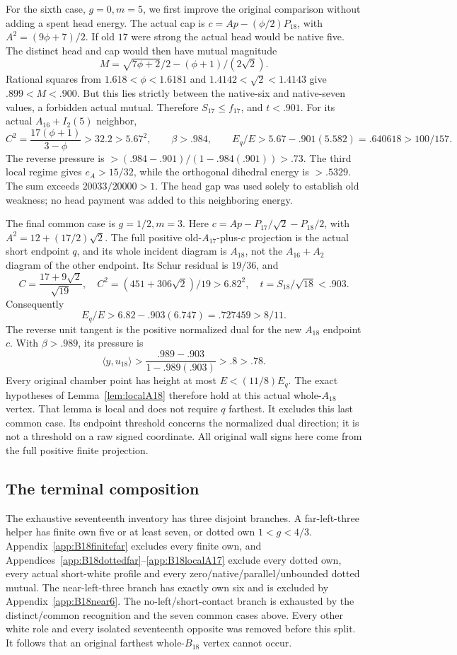\documentclass[11pt]{article}
\theoremstyle{definition}
\theoremstyle{remark}
\newcommand{\ip}[2]{\langle #1,#2\rangle}
\begin{document}
For the sixth case, \(g=0,m=5\), we first improve the original
comparison without adding a spent head energy.
The actual cap is \(c=Ap-(\phi/2)P_{18}\), with
\(A^2=(9\phi+7)/2\).
If old \(17\) were strong the actual head would be native five.
The distinct head and cap would then have mutual magnitude
\[
 M=\sqrt{7\phi+2}/2-(\phi+1)/(2\sqrt2).
\]
Rational squares from \(1.618<\phi<1.6181\) and
\(1.4142<\sqrt2<1.4143\) give \(.899<M<.900\).
But this lies strictly between the native-six and native-seven
values, a forbidden actual mutual.
Therefore \(S_{17}\leq f_{17}\), and \(t<.901\).
For its actual \(A_{16}+I_2(5)\) neighbor,
\[
 C^2=\frac{17(\phi+1)}{3-\phi}>32.2>5.67^2,\qquad
 \beta>.984,\qquad
 E_q/E>5.67-.901(5.582)=.640618>100/157 .
\]
The reverse pressure is
\(>(.984-.901)/(1-.984(.901))>.73\).
The third local regime gives \(e_A>15/32\), while the
orthogonal dihedral energy is \(>.5329\).
The sum exceeds \(20033/20000>1\).
The head gap was used solely to establish old weakness; no
head payment was added to this neighboring energy.

The final common case is \(g=1/2,m=3\).
Here \(c=Ap-P_{17}/\sqrt2-P_{18}/2\), with
\(A^2=12+(17/2)\sqrt2\).
The full positive old-\(A_{17}\)-plus-\(c\) projection is the
actual short endpoint \(q\), and its whole incident diagram is
\(A_{18}\), not the \(A_{16}+A_2\) diagram of the other endpoint.
Its Schur residual is \(19/36\), and
\[
 C=\frac{17+9\sqrt2}{\sqrt{19}},\quad
 C^2=(451+306\sqrt2)/19>6.82^2,\quad
 t=S_{18}/\sqrt{18}<.903 .
\]
Consequently
\[
 E_q/E>6.82-.903(6.747)=.727459>8/11 .
\]
The reverse unit tangent is the positive normalized dual for the
new \(A_{18}\) endpoint \(c\). With \(\beta>.989\),
its pressure is
\[
 \ip{y}{u_{18}}
 >\frac{.989-.903}{1-.989(.903)}>.8>.78 .
\]
Every original chamber point has height at most \(E<(11/8)E_q\).
The exact hypotheses of Lemma~\ref{lem:localA18} therefore hold
at this actual whole-\(A_{18}\) vertex.
That lemma is local and does not require \(q\) farthest.
It excludes this last common case. Its endpoint threshold concerns
the normalized dual direction; it is not a threshold on a raw
signed coordinate. All original wall signs here come from the
full positive finite projection.

\subsection{The terminal composition}
\label{app:B18conclusion}
The exhaustive seventeenth inventory has three disjoint branches.
A far-left-three helper has finite own five or at least seven,
or dotted own \(1<g<4/3\).
Appendix~\ref{app:B18finitefar} excludes every finite own, and
Appendices~\ref{app:B18dottedfar}--\ref{app:B18localA17}
exclude every dotted own, every actual short-white profile
and every zero/native/parallel/unbounded dotted mutual.
The near-left-three branch has exactly own six and is excluded
by Appendix~\ref{app:B18near6}.
The no-left/short-contact branch is exhausted by the distinct/common
recognition and the seven common cases above.
Every other white role and every isolated seventeenth opposite
was removed before this split.
It follows that an original farthest whole-\(B_{18}\) vertex
cannot occur.
\end{document}
